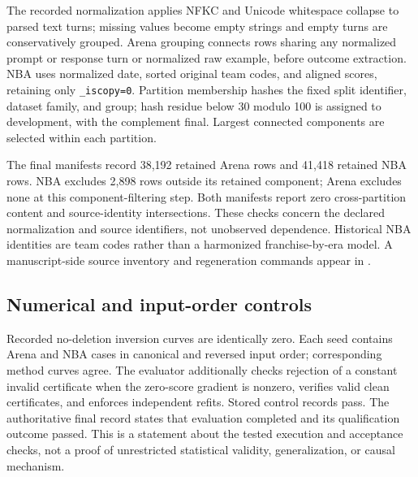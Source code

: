 \documentclass{article}
\begin{document}
The recorded normalization applies NFKC and Unicode whitespace collapse to parsed text turns; missing values become empty strings and empty turns are conservatively grouped. Arena grouping connects rows sharing any normalized prompt or response turn or normalized raw example, before outcome extraction. NBA uses normalized date, sorted original team codes, and aligned scores, retaining only \texttt{\_iscopy=0}. Partition membership hashes the fixed split identifier, dataset family, and group; hash residue below 30 modulo 100 is assigned to development, with the complement final. Largest connected components are selected within each partition.

The final manifests record 38,192 retained Arena rows and 41,418 retained NBA rows. NBA excludes 2,898 rows outside its retained component; Arena excludes none at this component-filtering step. Both manifests report zero cross-partition content and source-identity intersections. These checks concern the declared normalization and source identifiers, not unobserved dependence. Historical NBA identities are team codes rather than a harmonized franchise-by-era model. A manuscript-side source inventory and regeneration commands appear in .

\subsection{Numerical and input-order controls}
Recorded no-deletion inversion curves are identically zero. Each seed contains Arena and NBA cases in canonical and reversed input order; corresponding method curves agree. The evaluator additionally checks rejection of a constant invalid certificate when the zero-score gradient is nonzero, verifies valid clean certificates, and enforces independent refits. Stored control records pass. The authoritative final record states that evaluation completed and its qualification outcome passed. This is a statement about the tested execution and acceptance checks, not a proof of unrestricted statistical validity, generalization, or causal mechanism.
\end{document}
